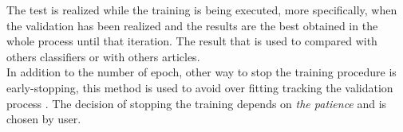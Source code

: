 The test is realized while the training is being executed, more specifically, when the validation has been realized and the results are the best obtained in the whole process until that iteration. The result that is used to compared with others classifiers or with others articles.\\

In addition to the number of epoch, other way to stop the training procedure is early-stopping, this method is used to avoid over fitting tracking the validation process \cite{Yoshua}. The decision of stopping the training depends on \textit{the patience} and is chosen by user.\\






